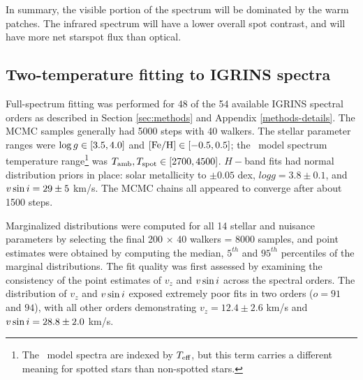 \documentclass[twocolumn]{emulateapj}%
\begin{document}
In summary, the visible portion of the spectrum will be dominated by the warm patches.  The infrared spectrum will have a lower overall spot contrast, and will have more net starspot flux than optical.


\subsection{Two-temperature fitting to IGRINS spectra}\label{sec:two_tempIGRINS}

Full-spectrum fitting was performed for 48 of the 54 available IGRINS spectral orders as described in Section \ref{sec:methods} and Appendix \ref{methods-details}.  The MCMC samples generally had 5000 steps with 40 walkers.  The stellar parameter ranges were $\log g \in [3.5, 4.0]$ and $[{\rm Fe}/{\rm H}] \in [-0.5, 0.5]$; the \PHOENIX\ model spectrum temperature range\footnote{The \PHOENIX\ model spectra are indexed by $T_\textrm{eff}$, but this term carries a different meaning for spotted stars than non-spotted stars.} was $T_\textrm{amb}, T_\textrm{spot} \in [2700, 4500]$.  $H-$band fits had normal distribution priors in place: solar metallicity to $\pm0.05$ dex, $logg=3.8\pm0.1$, and $v \sin i=29\pm5$ km/s.  The MCMC chains all appeared to converge after about 1500 steps.

Marginalized distributions were computed for all 14 stellar and nuisance parameters by selecting the final 200 $\times$ 40 walkers = 8000 samples, and point estimates were obtained by computing the median, $5^{th}$ and $95^{th}$ percentiles of the marginal distributions.  The fit quality was first assessed by examining the consistency of the point estimates of $v_z$ and $v \sin i$ across the spectral orders.  The distribution of $v_z$ and $v \sin i$ exposed extremely poor fits in two orders ($o=91$ and $94$), with all other orders demonstrating $v_z = 12.4 \pm 2.6$ km/s and $v \sin i = 28.8 \pm 2.0$ km/s.  
\end{document}
